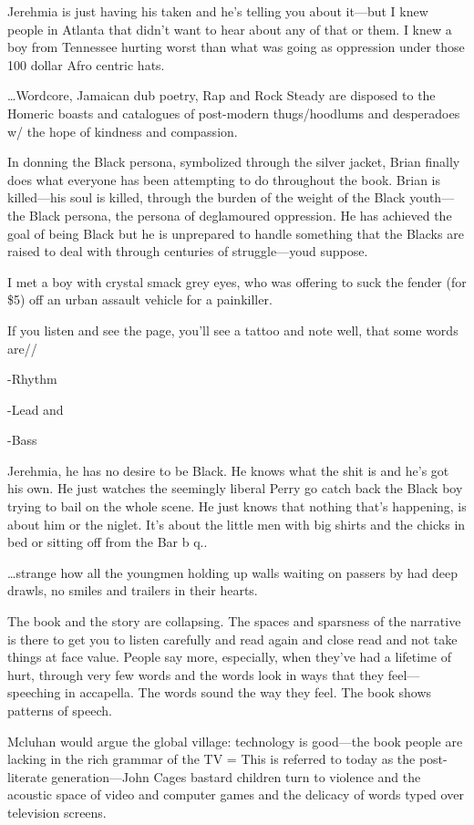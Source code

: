 \documentclass[
]{memoir}
\begin{document}
Jerehmia is just having his taken and he's telling you about it---but I
knew people in Atlanta that didn't want to hear about any of that or
them. I knew a boy from Tennessee hurting worst than what was going as
oppression under those 100 dollar Afro centric hats.

\ldots{}Wordcore, Jamaican dub poetry, Rap and Rock Steady are disposed
to the Homeric boasts and catalogues of post-modern thugs/hoodlums and
desperadoes w/ the hope of kindness and compassion.

In donning the Black persona, symbolized through the silver jacket,
Brian finally does what everyone has been attempting to do throughout
the book. Brian is killed---his soul is killed, through the burden of
the weight of the Black youth---the Black persona, the persona of
deglamoured oppression. He has achieved the goal of being Black but he
is unprepared to handle something that the Blacks are raised to deal
with through centuries of struggle---youd suppose.

I met a boy with crystal smack grey eyes, who was offering to suck the
fender (for \$5) off an urban assault vehicle for a painkiller.

If you listen and see the page, you'll see a tattoo and note well, that
some words are//

-Rhythm

-Lead and

-Bass

Jerehmia, he has no desire to be Black. He knows what the shit is and
he's got his own. He just watches the seemingly liberal Perry go catch
back the Black boy trying to bail on the whole scene. He just knows that
nothing that's happening, is about him or the niglet. It's about the
little men with big shirts and the chicks in bed or sitting off from the
Bar b q..

\ldots{}strange how all the youngmen holding up walls waiting on passers
by had deep drawls, no smiles and trailers in their hearts.

The book and the story are collapsing. The spaces and sparsness of the
narrative is there to get you to listen carefully and read again and
close read and not take things at face value. People say more,
especially, when they've had a lifetime of hurt, through very few words
and the words look in ways that they feel---speeching in accapella. The
words sound the way they feel. The book shows patterns of speech.

Mcluhan would argue the global village: technology is good---the book
people are lacking in the rich grammar of the TV = This is referred to
today as the post-literate generation---John Cages bastard children turn
to violence and the acoustic space of video and computer games and the
delicacy of words typed over television screens.
\end{document}
